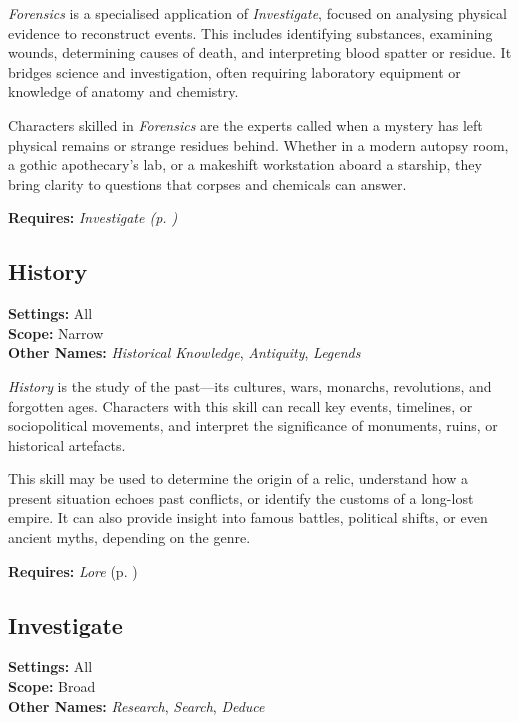 \emph{Forensics} is a specialised application of \emph{Investigate}, focused on analysing physical evidence to reconstruct events. This includes identifying substances, examining wounds, determining causes of death, and interpreting blood spatter or residue. It bridges science and investigation, often requiring laboratory equipment or knowledge of anatomy and chemistry.

Characters skilled in \emph{Forensics} are the experts called when a mystery has left physical remains or strange residues behind. Whether in a modern autopsy room, a gothic apothecary’s lab, or a makeshift workstation aboard a starship, they bring clarity to questions that corpses and chemicals can answer.

\vspace{0.5\baselineskip}
\noindent\textbf{Requires:} \emph{Investigate (p. \pageref{skill:investigate})}

\subsection{History}\label{skill:history}
\textbf{Settings:} All\\
\textbf{Scope:} Narrow\\
\textbf{Other Names:} \emph{Historical Knowledge}, \emph{Antiquity}, \emph{Legends}\\
\vspace{\baselineskip}

\emph{History} is the study of the past—its cultures, wars, monarchs, revolutions, and forgotten ages. Characters with this skill can recall key events, timelines, or sociopolitical movements, and interpret the significance of monuments, ruins, or historical artefacts.

This skill may be used to determine the origin of a relic, understand how a present situation echoes past conflicts, or identify the customs of a long-lost empire. It can also provide insight into famous battles, political shifts, or even ancient myths, depending on the genre.

\vspace{0.5\baselineskip}
\noindent\textbf{Requires:} \emph{Lore} (p. \pageref{skill:lore})

\subsection{Investigate}\label{skill:investigate}
\textbf{Settings:} All\\
\textbf{Scope:} Broad\\
\textbf{Other Names:} \emph{Research}, \emph{Search}, \emph{Deduce}\\
\vspace{\baselineskip}

